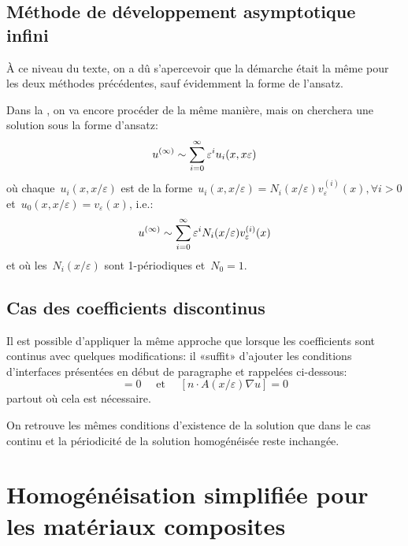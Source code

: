 \medskip
\subsection{Méthode de développement asymptotique infini}

À ce niveau du texte, on a dû s'apercevoir que la démarche était la même pour les deux méthodes précédentes, sauf évidemment la forme de l'ansatz.

Dans la , on va encore procéder de la même manière, mais on cherchera une solution sous la forme d'ansatz:
\begin{equation}
u^{(\infty)} \sim \displaystyle\sum_{i=0}^\infty \varepsilon^i u_i(x,x\varepsilon)
\end{equation}
où chaque~$u_i(x,x/\varepsilon)$ est de la forme~$u_i(x,x/\varepsilon)=N_i(x/\varepsilon)v_\varepsilon^{(i)}(x),
\forall i>0$ et~$u_0(x,x/\varepsilon)=v_\varepsilon(x)$, i.e.:
\begin{equation}
u^{(\infty)} \sim \displaystyle\sum_{i=0}^\infty \varepsilon^i N_i(x/\varepsilon)v_\varepsilon^{(i)}(x)
\end{equation}
et où les~$N_i(x/\varepsilon)$ sont 1-périodiques et~$N_0=1$.

\medskip
\subsection{Cas des coefficients discontinus}

Il est possible d'appliquer la même approche que lorsque les coefficients sont continus avec quelques modifications: il «suffit» d'ajouter les conditions d'interfaces présentées en début de paragraphe et rappelées ci-dessous:
\begin{equation} [u]=0 \quad \text{ et } \quad [n\cdot A(x/\varepsilon)\nabla u] = 0\end{equation}
partout où cela est nécessaire.

On retrouve les mêmes conditions d'existence de la solution que dans le cas continu et la périodicité de la solution homogénéisée reste inchangée.



\medskip
\section{Homogénéisation simplifiée pour les matériaux composites}


